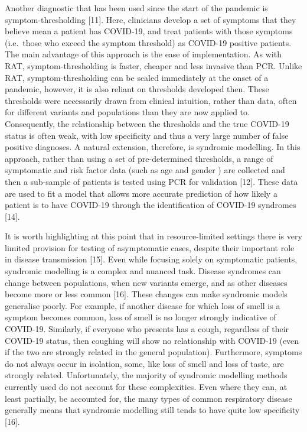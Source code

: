 \documentclass[]{elsarticle} %
\begin{document}
Another diagnostic that has been used since the start of the pandemic is symptom-thresholding {[}11{]}.
Here, clinicians develop a set of symptoms that they believe mean a patient has COVID-19, and treat patients with those symptoms (i.e.~those who exceed the symptom threshold) as COVID-19 positive patients.
The main advantage of this approach is the ease of implementation.
As with RAT, symptom-thresholding is faster, cheaper and less invasive than PCR.
Unlike RAT, symptom-thresholding can be scaled immediately at the onset of a pandemic, however, it is also reliant on thresholds developed then.
These thresholds were necessarily drawn from clinical intuition, rather than data, often for different variants and populations than they are now applied to.
Consequently, the relationship between the thresholds and the true COVID-19 status is often weak, with low specificity and thus a very large number of false positive diagnoses.
A natural extension, therefore, is syndromic modelling.
In this approach, rather than using a set of pre-determined thresholds, a range of symptomatic and risk factor data (such as age and gender ) are collected and then a sub-sample of patients is tested using PCR for validation {[}12{]}.
These data are used to fit a model that allows more accurate prediction of how likely a patient is to have COVID-19 through the identification of COVID-19 syndromes {[}14{]}.

It is worth highlighting at this point that in resource-limited settings there is very limited provision for testing of asymptomatic cases, despite their important role in disease transmission {[}15{]}.
Even while focusing solely on symptomatic patients, syndromic modelling is a complex and nuanced task.
Disease syndromes can change between populations, when new variants emerge, and as other diseases become more or less common {[}16{]}.
These changes can make syndromic models generalise poorly.
For example, if another disease for which loss of smell is a symptom becomes common, loss of smell is no longer strongly indicative of COVID-19.
Similarly, if everyone who presents has a cough, regardless of their COVID-19 status, then coughing will show no relationship with COVID-19 (even if the two are strongly related in the general population).
Furthermore, symptoms do not always occur in isolation, some, like loss of smell and loss of taste, are strongly related.
Unfortunately, the majority of syndromic modelling methods currently used do not account for these complexities.
Even where they can, at least partially, be accounted for, the many types of common respiratory disease generally means that syndromic modelling still tends to have quite low specificity {[}16{]}.
\end{document}
